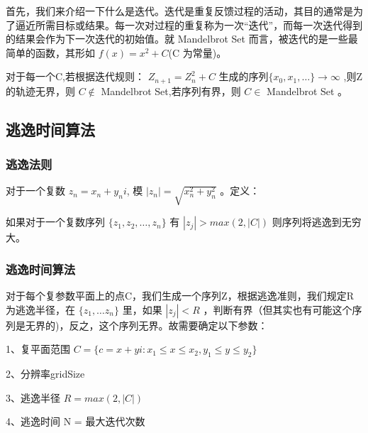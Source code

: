\documentclass{ctexart}
\begin{document}
首先，我们来介绍一下什么是迭代。迭代是重复反馈过程的活动，其目的通常是为了逼近所需目标或结果。每一次对过程的重复称为一次“迭代”，而每一次迭代得到的结果会作为下一次迭代的初始值。就 Mandelbrot Set 而言，被迭代的是一些最简单的函数，其形如 $f(x) = x^2 + C$(C 为常量)。

对于每一个C,若根据迭代规则： $Z_{n+1} = Z_n^2 + C$ 生成的序列$\{x_0, x_1,\dots\} \rightarrow \infty$ ,则Z的轨迹无界，则 $C \notin$  Mandelbrot Set,若序列有界，则 $C \in$ Mandelbrot Set 。

\subsection{逃逸时间算法}
\subsubsection{逃逸法则}

对于一个复数 $z_n = x_n + y_ni$, 模 $|z_n| = \sqrt{x_n^2 + y_n^2}$ 。定义：

如果对于一个复数序列 $\{z_1, z_2, \dots, z_n\}$ 有 $|z_j| > max(2,|C|)$ 则序列将逃逸到无穷大。

\subsubsection{逃逸时间算法}

对于每个复参数平面上的点C，我们生成一个序列Z，根据逃逸准则，我们规定R为逃逸半径，在 $\{z_1, \dots z_n\}$ 里，如果 $|z_j| < R$ ，判断有界（但其实也有可能这个序列是无界的)，反之，这个序列无界。故需要确定以下参数：

1、复平面范围 $C = \{c = x + yi: x_1 \le x \le x_2, y_1 \le y \le y_2 \}$
  
2、分辨率gridSize

3、逃逸半径 $R = max(2, |C|)$

4、逃逸时间 N = 最大迭代次数
\end{document}
